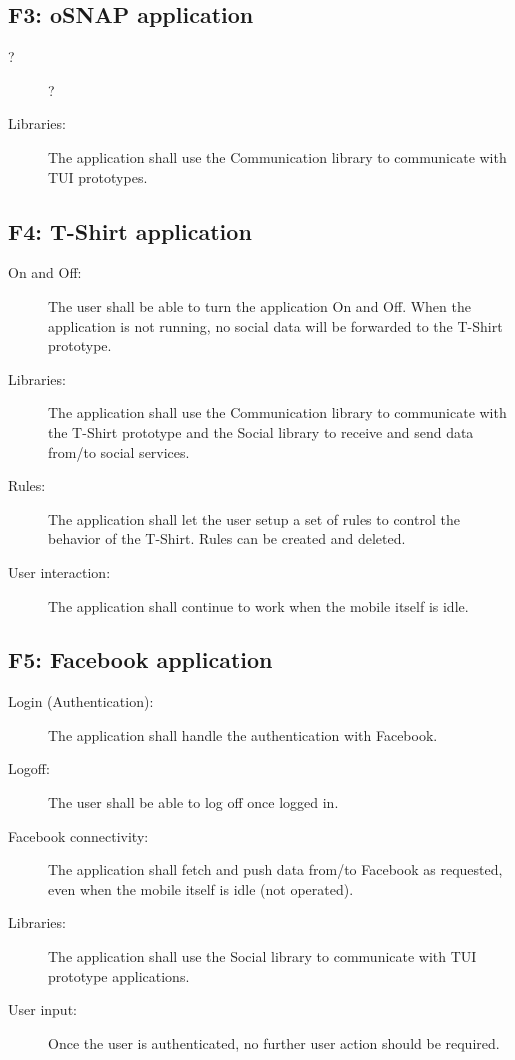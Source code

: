 \newpage

\subsection{F3: oSNAP application}
\begin{description}
	\item[?] ?
	\item[Libraries:] The application shall use the Communication library
	to communicate with TUI prototypes.
\end{description}

\subsection{F4: T-Shirt application}
\begin{description}
	\item[On and Off:] The user shall be able to turn the application On
	and Off. When the application is not running, no social data will be
	forwarded to the T-Shirt prototype.
	\item[Libraries:] The application shall use the Communication library to
	communicate with the T-Shirt prototype and the Social library to
	receive and send data from/to social services.
	\item[Rules:] The application shall let the user setup a set of rules
	to control the behavior of the T-Shirt. Rules can be created and deleted.
	\item[User interaction:] The application shall continue to work
	when the mobile itself is idle.
\end{description}

\subsection{F5: Facebook application}
\begin{description}
	\item[Login (Authentication):] The application shall handle the
	authentication with Facebook.
	\item[Logoff:] The user shall be able to log off once logged in.
	\item[Facebook connectivity:] The application shall fetch and push data
	from/to Facebook as requested, even when the mobile itself is idle
	(not operated).
	\item[Libraries:] The application shall use the Social library to
	communicate with TUI prototype applications.
	\item[User input:] Once the user is authenticated, no further user action
	should be required.
\end{description}

